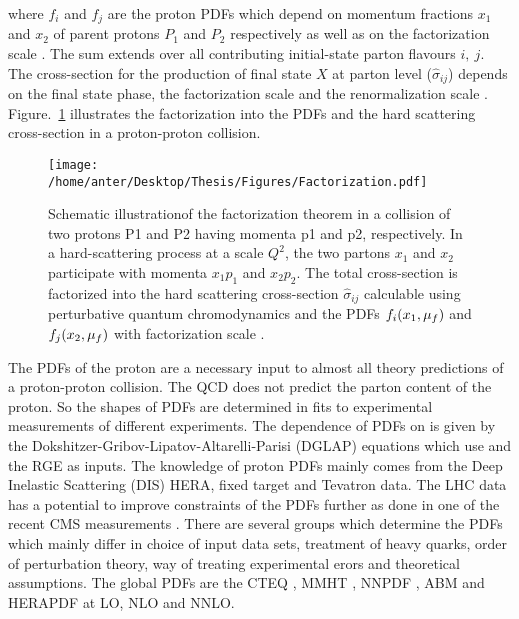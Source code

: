 where $f_i$ and $f_{j}$ are the proton PDFs which depend on momentum fractions $x_1$ and $x_2$ of parent protons $P_1$ and $P_2$ respectively as well as on the factorization scale \muf. The sum extends over all contributing initial-state parton flavours $i,~j$. The cross-section for the production of final state $X$ at parton level ($\hat\sigma_{ij}$) depends on the final state phase, the factorization scale \muf and the renormalization scale \mur. Figure.~\ref{fig:fac} illustrates the factorization into the PDFs and the hard scattering cross-section in a proton-proton collision.
\begin{figure}[!h]
\begin{center}
\hspace*{-7mm}
\texttt{[image: /home/anter/Desktop/Thesis/Figures/Factorization.pdf]}\\
\vspace*{4mm}
\caption[Schematic illustration of the factorization theorem in a collision of two protons.]{Schematic illustration\footnotemark of the factorization theorem in a collision of two protons P1 and P2 having momenta p1 and p2, respectively. In a hard-scattering process at a scale $Q^2$, the two partons $x_1$ and $x_2$ participate with momenta $x_1p_1$ and $x_2p_2$. The total cross-section is factorized into the hard scattering cross-section $\hat\sigma_{ij}$ calculable using perturbative quantum chromodynamics and the PDFs $f_i(x_1,\mu_f)$ and $f_j(x_2,\mu_f)$ with factorization scale \muf.}
\label{fig:fac}
\end{center}
\end{figure}

The PDFs of the proton are a necessary input to almost all theory predictions of a proton-proton collision. The QCD does not predict the parton content of the proton. So the shapes of PDFs are determined in fits to experimental measurements of different experiments. The dependence of PDFs on \muf is given by the Dokshitzer-Gribov-Lipatov-Altarelli-Parisi (DGLAP) \cite{Gribov:1972ri,Dokshitzer:1977sg,Altarelli:1977zs} equations which use \alps and the RGE as inputs. The knowledge of proton PDFs mainly comes from the Deep Inelastic Scattering (DIS) HERA, fixed target and Tevatron data. The LHC data has a potential to improve constraints of the PDFs further as done in one of the recent CMS measurements \cite{Sirunyan:2017skj}. There are several groups which determine the PDFs which mainly differ in choice of input data sets, treatment of heavy quarks, order of perturbation theory, way of treating experimental erors and theoretical assumptions. The global PDFs are the CTEQ \cite{Dulat:2015mca}, MMHT \cite{Harland-Lang:2014zoa}, NNPDF \cite{Ball:2014uwa}, ABM \cite{Alekhin:2012ig} and HERAPDF \cite{Abramowicz:2015mha} at LO, NLO and NNLO.%

